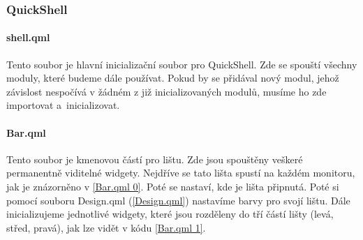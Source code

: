 \documentclass[12pt,a4paper]{article}
\begin{document}
\subsubsection{QuickShell}

\begin{center}  \end{center}

\paragraph{shell.qml}
\label{shell.qml}
Tento soubor je hlavní inicializační soubor pro QuickShell. Zde se spouští všechny moduly, které budeme dále používat.
Pokud by se přidával nový modul, jehož závislost nespočívá v žádném z již inicializovaných modulů, musíme ho zde importovat
a~inicializovat.

\paragraph{Bar.qml}
\label{Bar.qml}
Tento soubor je kmenovou částí pro lištu. Zde jsou spouštěny veškeré permanentně viditelné widgety.
Nejdříve se tato lišta spustí na každém monitoru, jak je znázorněno v \ref{Bar.qml 0}. Poté se nastaví,
kde je lišta připnutá. Poté si pomocí souboru Design.qml (\ref{Design.qml}) nastavíme barvy pro svojí lištu.
Dále inicializujeme jednotlivé widgety, které jsou rozděleny do tří částí lišty (levá, střed, pravá),
jak lze vidět v kódu \ref{Bar.qml 1}.
\end{document}
